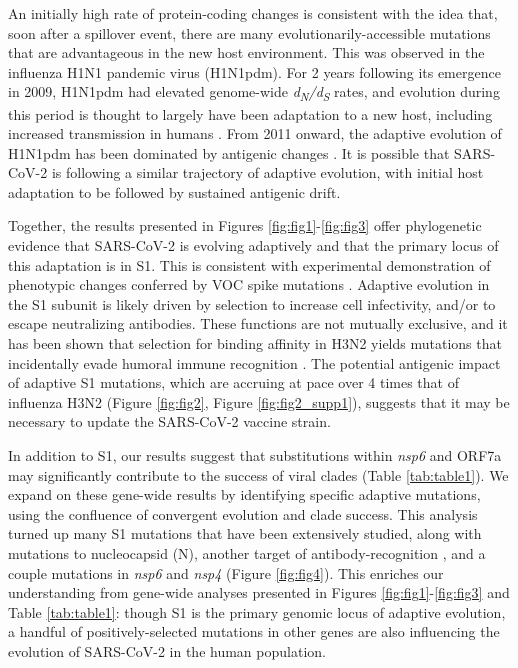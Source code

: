 \documentclass[11pt,oneside,letterpaper]{article}
\begin{document}
An initially high rate of protein-coding changes is consistent with the idea that, soon after a spillover event, there are many evolutionarily-accessible mutations that are advantageous in the new host environment. This was observed in the influenza H1N1 pandemic virus (H1N1pdm). For 2 years following its emergence in 2009, H1N1pdm had elevated genome-wide \emph{d\textsubscript{N}/d\textsubscript{S}} rates, and evolution during this period is thought to largely have been adaptation to a new host, including increased transmission in humans \cite{Su2015-az}. From 2011 onward, the adaptive evolution of H1N1pdm has been dominated by antigenic changes \cite{Su2015-az}. It is possible that SARS-CoV-2 is following a similar trajectory of adaptive evolution, with initial host adaptation to be followed by sustained antigenic drift.

Together, the results presented in Figures \ref{fig:fig1}-\ref{fig:fig3} offer phylogenetic evidence that SARS-CoV-2 is evolving adaptively and that the primary locus of this adaptation is in S1. This is consistent with experimental demonstration of phenotypic changes conferred by VOC spike mutations \cite{Wang2021-dm, Greaney2021-jn, Li2020-jd, Liu2021-ne}. Adaptive evolution in the S1 subunit is likely driven by selection to increase cell infectivity, and/or to escape neutralizing antibodies. These functions are not mutually exclusive, and it has been shown that selection for binding affinity in H3N2 yields mutations that incidentally evade humoral immune recognition \cite{Hensley2009-at}. The potential antigenic impact of adaptive S1 mutations, which are accruing at pace over 4 times that of influenza H3N2 (Figure \ref{fig:fig2}, Figure \ref{fig:fig2_supp1}), suggests that it may be necessary to update the SARS-CoV-2 vaccine strain.

In addition to S1, our results suggest that substitutions within \emph{nsp6} and ORF7a may significantly contribute to the success of viral clades (Table \ref{tab:table1}). We expand on these gene-wide results by identifying specific adaptive mutations, using the confluence of convergent evolution and clade success. This analysis turned up many S1 mutations that have been extensively studied, along with mutations to nucleocapsid (N), another target of antibody-recognition \cite{Kang2021-pe}, and a couple mutations in \emph{nsp6} and \emph{nsp4} (Figure \ref{fig:fig4}). This enriches our understanding from gene-wide analyses presented in Figures \ref{fig:fig1}-\ref{fig:fig3} and Table \ref{tab:table1}: though S1 is the primary genomic locus of adaptive evolution, a handful of positively-selected mutations in other genes are also influencing the evolution of SARS-CoV-2 in the human population.
\end{document}
